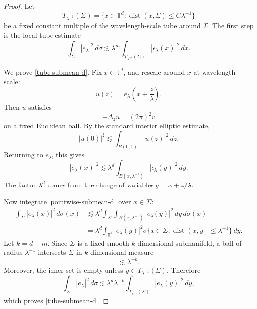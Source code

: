 \documentclass[11pt,reqno]{amsart}
\numberwithin{equation}{section}
\newcommand{\1}{\textbf{1}}
\newcommand{\T}{\mathbb T}
\DeclareMathOperator{\dist}{dist}
\begin{document}
	\begin{proof}
		Let
		\[
		T_{\lambda^{-1}}(\Sigma)
		=
		\{x\in\T^d:\dist(x,\Sigma)\le C\lambda^{-1}\}
		\]
		be a fixed constant multiple of the wavelength-scale tube around \(\Sigma\).
		The first step is the local tube estimate
		\begin{equation}\label{tube-submean-d}
			\int_\Sigma |e_\lambda|^2\,d\sigma
			\lesssim
			\lambda^{m}
			\int_{T_{\lambda^{-1}}(\Sigma)}
			|e_\lambda(x)|^2\,dx .
		\end{equation}
		
		We prove \eqref{tube-submean-d}.  Fix \(x\in\T^d\), and rescale around \(x\)
		at wavelength scale:
		\[
		u(z)=e_\lambda\left(x+\frac{z}{\lambda}\right).
		\]
		Then \(u\) satisfies
		\[
		-\Delta_z u=(2\pi)^2u
		\]
		on a fixed Euclidean ball.  By the standard interior elliptic estimate,
		\[
		|u(0)|^2
		\lesssim
		\int_{B(0,1)}|u(z)|^2\,dz.
		\]
		Returning to \(e_\lambda\), this gives
		\begin{equation}\label{pointwise-submean-d}
			|e_\lambda(x)|^2
			\lesssim
			\lambda^d
			\int_{B(x,\lambda^{-1})}
			|e_\lambda(y)|^2\,dy .
		\end{equation}
		The factor \(\lambda^d\) comes from the change of variables
		\(y=x+z/\lambda\).
		
		Now integrate \eqref{pointwise-submean-d} over \(x\in\Sigma\):
		\[
		\begin{aligned}
			\int_\Sigma |e_\lambda(x)|^2\,d\sigma(x)
			&\lesssim
			\lambda^d
			\int_\Sigma
			\int_{B(x,\lambda^{-1})}
			|e_\lambda(y)|^2\,dy\,d\sigma(x)     \\
			&=
			\lambda^d
			\int_{\T^d}
			|e_\lambda(y)|^2
			\sigma\{x\in\Sigma:\dist(x,y)\le \lambda^{-1}\}
			\,dy .
		\end{aligned}
		\]
		Let $k=d-m$. Since \(\Sigma\) is a fixed smooth \(k\)-dimensional submanifold, a ball of
		radius \(\lambda^{-1}\) intersects \(\Sigma\) in \(k\)-dimensional measure
		\[
		\lesssim \lambda^{-k}.
		\]
		Moreover, the inner set is empty unless
		\(y\in T_{\lambda^{-1}}(\Sigma)\).  Therefore
		\[
		\int_\Sigma |e_\lambda|^2\,d\sigma
		\lesssim
		\lambda^d\lambda^{-k}
		\int_{T_{\lambda^{-1}}(\Sigma)}
		|e_\lambda(y)|^2\,dy,
		\]
		which proves \eqref{tube-submean-d}.
		

\end{proof}
\end{document}
